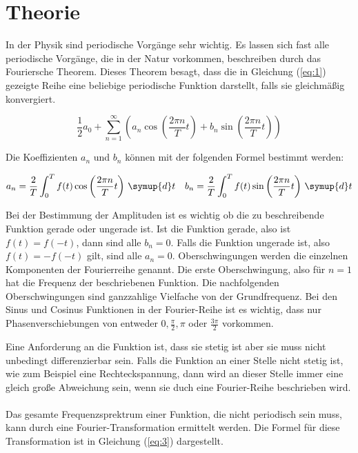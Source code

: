 \section{Theorie}

In der Physik sind periodische Vorgänge sehr wichtig. Es lassen sich fast alle
periodische Vorgänge, die in der Natur vorkommen, beschreiben durch das Fouriersche
Theorem. Dieses Theorem besagt, dass die in Gleichung (\ref{eq:1}) gezeigte Reihe eine
beliebige periodische Funktion darstellt, falls sie gleichmäßig konvergiert.

\begin{equation}
  \frac{1}{2} a_0 + \sum^{\infty}_{n=1} \left( a_n \cos\left(\frac{2\pi n}{T} t\right) +
  b_n \sin\left(\frac{2\pi n}{T}t\right) \right)
  \label{eq:1}
\end{equation}

Die Koeffizienten $a_n$ und $b_n$ können mit der folgenden Formel bestimmt werden:

\begin{align}
  a_n = \frac{2}{T} \int_0^T f(t) \cos\left(\frac{2\pi n}{T} t\right) \, \symup{d}t &&
  b_n = \frac{2}{T} \int_0^T f(t) \sin\left(\frac{2\pi n}{T} t\right) \, \symup{d}t
  \label{eq:2}
\end{align}

Bei der Bestimmung der Amplituden ist es wichtig ob die zu beschreibende Funktion gerade oder
ungerade ist. Ist die Funktion gerade, also ist $f(t)=f(-t)$, dann sind alle $b_n=0$.
Falls die Funktion ungerade ist, also $f(t)=-f(-t)$ gilt, sind alle $a_n=0$.
Oberschwingungen werden die einzelnen Komponenten der Fourierreihe genannt. Die erste
Oberschwingung, also für $n=1$ hat die Frequenz der beschriebenen Funktion.
Die nachfolgenden Oberschwingungen sind ganzzahlige Vielfache von der Grundfrequenz.
Bei den Sinus und Cosinus Funktionen in der Fourier-Reihe ist es wichtig, dass nur
Phasenverschiebungen von entweder $0, \frac{\pi}{2}, \pi$ oder $\frac{3\pi}{2}$
vorkommen.

Eine Anforderung an die Funktion ist, dass sie stetig ist aber sie muss nicht unbedingt
differenzierbar sein. Falls die Funktion an einer Stelle nicht stetig ist, wie zum
Beispiel eine Rechteckspannung, dann wird an dieser Stelle immer eine gleich große Abweichung sein,
wenn sie duch eine Fourier-Reihe beschrieben wird. \\\\

Das gesamte Frequenzsprektrum einer Funktion, die nicht periodisch sein muss, kann durch eine
Fourier-Transformation ermittelt werden. Die Formel für diese Transformation ist in
Gleichung (\ref{eq:3}) dargestellt.

